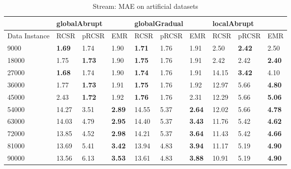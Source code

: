\documentclass[conference,compsoc]{IEEEtran}
\begin{document}
\begin{table} [h]
\centering
\caption{Stream: MAE on artificial datasets}
\label{tab2}
\begin{tabular}{|l|l|l|l|l|l|l|l|l|l|}
\hline
          & \multicolumn{3}{l|}{globalAbrupt} & \multicolumn{3}{l|}{globalGradual} & \multicolumn{3}{l|}{localAbrupt} \\ \hline
Data Instance & RCSR       & pRCSR     & EMR      & RCSR       & pRCSR      & EMR      & RCSR      & pRCSR     & EMR      \\ \hline
9000       & \textbf{1.69}       & 1.74      & 1.90     & \textbf{1.71}       & 1.76       & 1.91     & 2.50      & \textbf{2.42}      & 2.50     \\ \hline
18000      & 1.75       & \textbf{1.73}      & 1.90     & \textbf{1.75}       & 1.76       & 1.91     & 2.42      & 2.42      & \textbf{2.40}     \\ \hline
27000      & \textbf{1.68}       & 1.74      & 1.90     & \textbf{1.74}       & 1.76       & 1.91     & 14.15     & \textbf{3.42}      & 4.10     \\ \hline
36000      & 1.77       & \textbf{1.73}      & 1.91     & \textbf{1.75}       & 1.76       & 1.92     & 12.97     & 5.66      & \textbf{4.80}     \\ \hline
45000      & 2.43       & \textbf{1.72}      & 1.92     & \textbf{1.76}       & 1.76       & 2.31     & 12.29     & 5.66      & \textbf{5.06}     \\ \hline
54000      & 14.27      & 3.51      & \textbf{2.89}     & 14.55      & 5.37       & \textbf{2.64}     & 12.02     & 5.66      & \textbf{4.78}     \\ \hline
63000      & 14.03      & 4.79      & \textbf{2.95}     & 14.40      & 5.37       & \textbf{3.43}     & 11.76     & 5.42      & \textbf{4.62}     \\ \hline
72000      & 13.85      & 4.52      & \textbf{2.98}     & 14.21      & 5.37       & \textbf{3.64}     & 11.43     & 5.42      & \textbf{4.66}     \\ \hline
81000      & 13.69      & 5.41      & \textbf{3.42}     & 13.94      & 4.83       & \textbf{3.94}     & 11.17     & 5.19      & \textbf{4.90}     \\ \hline
90000      & 13.56      & 6.13      & \textbf{3.53}     & 13.61      & 4.83       & \textbf{3.88}     & 10.91     & 5.19      & \textbf{4.90}     \\ \hline
\end{tabular}
\end{table}
\end{document}
